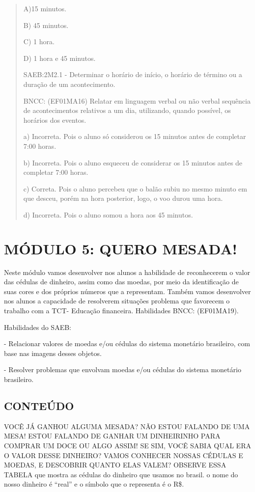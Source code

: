 \begin{quote}
A)15 minutos.

B) 45 minutos.

C) 1 hora.

D) 1 hora e 45 minutos.

SAEB:2M2.1 - Determinar o horário de início, o horário de término ou a
duração de um acontecimento.

BNCC: (EF01MA16) Relatar em linguagem verbal ou não verbal sequência de
acontecimentos relativos a um dia, utilizando, quando possível, os
horários dos eventos.

a) Incorreta. Pois o aluno só considerou os 15 minutos antes de
completar 7:00 horas.

b) Incorreta. Pois o aluno esqueceu de considerar os 15 minutos antes de
completar 7:00 horas.

c) Correta. Pois o aluno percebeu que o balão subiu no mesmo minuto em
que desceu, porém na hora posterior, logo, o voo durou uma hora.

d) Incorreta. Pois o aluno somou a hora aos 45 minutos.
\end{quote}

\section{MÓDULO 5: QUERO MESADA!}\label{muxf3dulo-5-quero-mesada}

Neste módulo vamos desenvolver nos alunos a habilidade de reconhecerem o
valor das cédulas de dinheiro, assim como das moedas, por meio da
identificação de suas cores e dos próprios números que a representam.
Também vamos desenvolver nos alunos a capacidade de resolverem situações
problema que favorecem o trabalho com a TCT- Educação financeira.
Habilidades BNCC: (EF01MA19).

Habilidades do SAEB:

- Relacionar valores de moedas e/ou cédulas do sistema monetário
brasileiro, com base nas imagens desses objetos.

- Resolver problemas que envolvam moedas e/ou cédulas do sistema
monetário brasileiro.

\subsection{CONTEÚDO}\label{conteuxfado-4}

VOCÊ JÁ GANHOU ALGUMA MESADA? NÃO ESTOU FALANDO DE UMA MESA! ESTOU
FALANDO DE GANHAR UM DINHEIRINHO PARA COMPRAR UM DOCE OU ALGO ASSIM! SE
SIM, VOCÊ SABIA QUAL ERA O VALOR DESSE DINHEIRO? VAMOS CONHECER NOSSAS
CÉDULAS E MOEDAS, E DESCOBRIR QUANTO ELAS VALEM? OBSERVE ESSA TABELA que
mostra as cédulas do dinheiro que usamos no brasil. o nome do nosso
dinheiro é ``real'' e o símbolo que o representa é o R\$.

